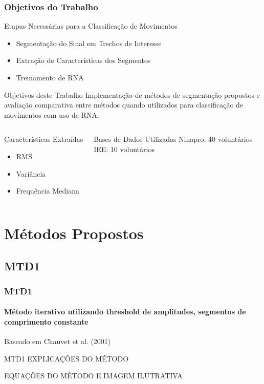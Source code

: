 \documentclass{beamer}
\begin{document}
	\begin{frame}
		\frametitle{Objetivos do Trabalho}
		
		\begin{alertblock}{Etapas Necessárias para a Classificação de Movimentos}
		\begin{itemize}
			\item Segmentação do Sinal em Trechos de Interesse
			\item Extração de Características dos Segmentos
			\item Treinamento de RNA
		\end{itemize}
		\end{alertblock}
		
		\begin{block}{Objetivos deste Trabalho}
			Implementação de métodos de segmentação propostos e avaliação comparativa entre métodos quando utilizados para classificação de movimentos com uso de RNA.
		\end{block}
		
		\begin{columns}[c]
		
				\begin{exampleblock}{Características Extraídas}
					\begin{itemize}
						\item RMS
						\item Variância
						\item Frequência Mediana
					\end{itemize}
				\end{exampleblock}
				
				\begin{exampleblock}{Bases de Dados Utilizadas}
					Ninapro: 40 voluntários\\
					IEE: 10 voluntários
				\end{exampleblock}
		
		\end{columns}
	\end{frame}

	\section[Métodos Propostos]{Métodos Propostos}
	
	\subsection[MTD1]{MTD1}
	\begin{frame}
		\frametitle{MTD1}
		\framesubtitle{Método iterativo utilizando threshold de amplitudes, segmentos de comprimento constante}
		
		Baseado em Chauvet et al. (2001)
		
		\begin{block}{MTD1}
			EXPLICAÇÕES DO MÉTODO
		\end{block}
		
		EQUAÇÕES DO MÉTODO E IMAGEM ILUTRATIVA
		
	\end{frame}
	
\end{document}
